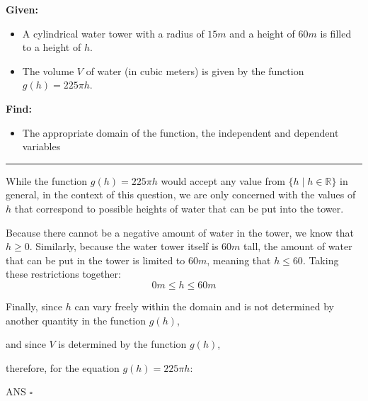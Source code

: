 \begin{homework}
    \date{May 17, 2022}

    \begin{exercise}
        \textbf{Given:}
        \begin{itemize}
            \item A cylindrical water tower with a radius of $15m$ and a height of $60m$ is filled to a height of $h$.
            \item The volume $V$ of water​ (in cubic​ meters) is given by the function​ $g(h) = 225\pi h$.
        \end{itemize}
    
        \textbf{Find:}
        \begin{itemize}
            \item The appropriate domain of the function, the independent and dependent variables
        \end{itemize}
    \end{exercise}
    \rule{\textwidth}{0.4pt}
    
    \begin{solution}
        While the function $g(h) = 225\pi h$ would accept any value from $\{ h \mid h \in \mathbb{R}\}$ in general,
        in the context of this question, we are only concerned with the values of $h$ that correspond to possible
        heights of water that can be put into the tower.
        
        Because there cannot be a negative amount of water in the tower, we know that $h \geq 0$.
        Similarly, because the water tower itself is $60m$ tall, the amount of water that can be put in the tower
        is limited to $60m$, meaning that $h \leq 60$.
        Taking these restrictions together: $$0m \leq h \leq 60m$$
    
        Finally, since $h$ can vary freely within the domain and is not determined by another quantity in the function $g(h)$,
    
        and since $V$ is determined by the function $g(h)$,
        
        therefore, for the equation $g(h) = 225\pi h$:
    
        \nopagebreak
        \hfill ANS $\square$
    \end{solution}
\end{homework}

